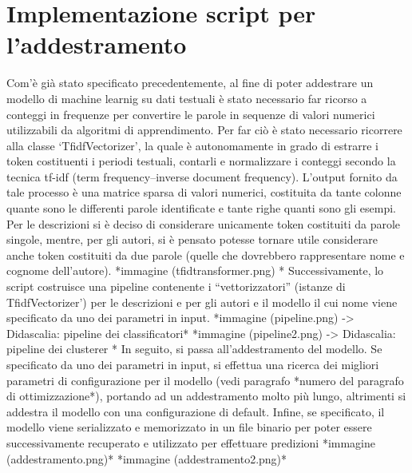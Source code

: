 \documentclass[12pt,oneside]{article}
\begin{document}
\section{Implementazione script per l'addestramento}
    \begin{justify}
        Com’è già stato specificato precedentemente, al fine di poter addestrare un modello di machine learnig su dati testuali è stato necessario far ricorso a conteggi in frequenze per convertire le parole in sequenze di valori numerici utilizzabili da algoritmi di apprendimento. Per far ciò è stato necessario ricorrere alla classe ‘TfidfVectorizer’, la quale è autonomamente in grado di estrarre i token costituenti i periodi testuali, contarli e normalizzare i conteggi secondo la tecnica tf-idf (term frequency–inverse document frequency). L’output fornito  da tale processo è una matrice sparsa di valori numerici, costituita da tante colonne quante sono le differenti parole identificate e tante righe quanti sono gli esempi. Per le descrizioni si è deciso di considerare unicamente token costituiti da parole singole, mentre, per gli autori, si è pensato potesse tornare utile considerare anche token costituiti da due parole (quelle che dovrebbero rappresentare nome e cognome dell’autore).
        *immagine (tfidtransformer.png) *
        Successivamente, lo script costruisce una pipeline contenente i “vettorizzatori” (istanze di TfidfVectorizer’) per le descrizioni e per gli autori e il modello il cui nome viene specificato da uno dei parametri in input.
        *immagine (pipeline.png) -> Didascalia: pipeline dei classificatori*
        *immagine (pipeline2.png) -> Didascalia: pipeline dei clusterer *
        In seguito, si passa all’addestramento del modello. Se specificato da uno dei parametri in input, si effettua una ricerca dei migliori parametri di configurazione per il modello (vedi paragrafo *numero del paragrafo di ottimizzazione*), portando ad un addestramento molto più lungo, altrimenti si addestra il modello con una configurazione di default. Infine, se specificato, il modello viene serializzato e memorizzato in un file binario per poter essere successivamente recuperato e utilizzato per effettuare predizioni
        *immagine (addestramento.png)*
        *immagine (addestramento2.png)*
    \end{justify}
\end{document}
